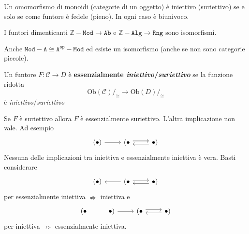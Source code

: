 \begin{example}{}
    Un omomorfismo di monoidi (categorie di un oggetto) è iniettivo (suriettivo)
    se e solo se come funtore è fedele (pieno). In ogni caso è biunivoco.
\end{example}

\begin{example}{}
    I funtori dimenticanti \(\mathtt{\mathbb{Z}-Mod} \to \mathtt{Ab}\) e \(\mathtt{\mathbb{Z}-Alg} \to \mathtt{Rng}\) sono isomorfismi.
\end{example}

\begin{example}{}
    Anche \(\mathtt{Mod-A}\cong \mathtt{A^{op}-Mod}\) ed esiste un isomorfismo
    (anche se non sono categorie piccole).
\end{example}

\begin{definition}{}
    Un funtore \(F: \mathcal{C} \to D\) è \textbf{essenzialmente
    \emph{iniettivo}/\emph{suriettivo}} se la funzione ridotta 
    \[
        \mathrm{Ob}{(\mathcal{C})}/_{\cong} \to \mathrm{Ob}{(D)}/_{\cong}
    \]
    è \emph{iniettivo}/\emph{suriettivo}
\end{definition}

\begin{remark}{}
    Se \(F\) è suriettivo allora \(F\) è essenzialmente suriettivo. L'altra
    implicazione non vale. Ad esempio
\[\begin{tikzcd}
	{(\bullet)} & {(\bullet} & {\bullet)}
	\arrow[from=1-1, to=1-2]
	\arrow[shift left, from=1-2, to=1-3]
	\arrow[shift left, from=1-3, to=1-2]
\end{tikzcd}\]
    Nessuna delle implicazioni tra iniettiva e essenzialmente iniettiva è vera.
    Basti considerare
\[\begin{tikzcd}
	{(\bullet)} & {(\bullet} & {\bullet)}
	\arrow[from=1-2, to=1-1]
	\arrow[shift left, from=1-2, to=1-3]
	\arrow[shift left, from=1-3, to=1-2]
\end{tikzcd}\]
    per essenzialmente iniettiva \(\nRightarrow\) iniettiva
    e
\[\begin{tikzcd}
	{(\bullet} & {\bullet)} & {(\bullet} & {\bullet)}
	\arrow[from=1-2, to=1-3]
	\arrow[shift left, from=1-3, to=1-4]
	\arrow[shift left, from=1-4, to=1-3]
\end{tikzcd}\]
    per iniettiva \(\nRightarrow\) essenzialmente iniettiva.
\end{remark}

